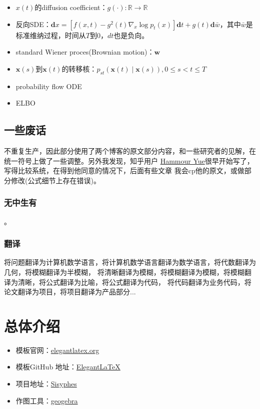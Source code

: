 \begin{itemize}
    \item $x(t)$的diffusion coefficient：$g(\cdot):\mathbb{R} \rightarrow \mathbb{R}$
    \item 反向SDE：$\mathbf{d} x=\left[f(x, t)-g^2(t) \nabla_x \log p_t(x)\right] \mathbf{d} t+g(t) \mathbf{d} \bar{w}$，其中$\bar{w}$是标准维纳过程，时间从$T$到$0$，$dt$也是负向。
    \item standard Wiener proces(Brownian motion)：$\boldsymbol{w}$
    \item $\mathbf{x}(s)$到$\mathbf{x}(t)$的转移核：$p_{s t}(\mathbf{x}(t) \mid \mathbf{x}(s)),0 \leqslant s<t \leqslant T$
    \item probability flow ODE
    \item ELBO

\end{itemize}
\section{一些废话}
不重复生产，因此部分使用了两个博客的原文部分内容，和一些研究者的见解，在统一符号上做了一些调整。另外我发现，知乎用户
\href{https://www.zhihu.com/people/bai-e-ji-wan-qi}{Hammour Yue}很早开始写了，写得比较系统，在得到他同意的情况下，后面有些文章
我会cp他的原文，或做部分修改(公式细节上存在错误)。
\subsection{无中生有}
。
\subsection{翻译}
将问题翻译为计算机数学语言，将计算机数学语言翻译为数学语言，将代数翻译为几何，将模糊翻译为半模糊，
将清晰翻译为模糊，将模糊翻译为模糊，将模糊翻译为清晰，将公式翻译为比喻，将公式翻译为代码，
将代码翻译为业务代码，将论文翻译为项目，将项目翻译为产品部分...

\chapter{总体介绍}

\begin{itemize}
  \item 模板官网：\href{https://elegantlatex.org/}{elegantlatex.org}
  \item 模板GitHub 地址：\href{https://github.com/ElegantLaTeX/}{ElegantLaTeX}
  \item 项目地址：\href{https://github.com/foocker/AIGC}{Sisyphes}
  \item 作图工具：\href{https://www.geogebra.org/?lang=en}{geogebra}
\end{itemize}


